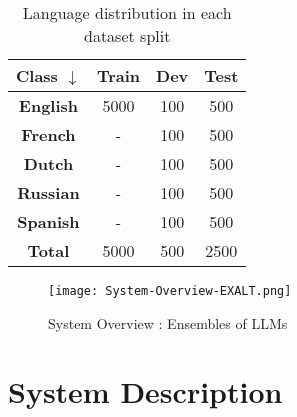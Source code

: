 \documentclass[11pt]{article}
\begin{document}
\begin{table}[!ht]
    \centering
    \begin{tabular}{|c|c|c|c|}
    \hline
    \textbf{Class $\downarrow$}  & \textbf{Train}       & \textbf{Dev}         & \textbf{Test}    \\
    \hline
    \textbf{English}             & 5000                 & 100                  & 500              \\
    \textbf{French}              & -                    & 100                  & 500              \\
    \textbf{Dutch}               & -                    & 100                  & 500              \\
    \textbf{Russian}             & -                    & 100                  & 500              \\
    \textbf{Spanish}             & -                    & 100                  & 500              \\
    \hline
    \textbf{Total}               & 5000                 & 500                  & 2500             \\
    \hline
    \end{tabular}
    \caption{Language distribution in each dataset split}
    \label{table:2}
\end{table}


\begin{figure*}[!ht]
    \centering
    \texttt{[image: System-Overview-EXALT.png]}
    \caption{System Overview : Ensembles of LLMs}
    \label{figure:1}
\end{figure*}

\section{System Description}
\end{document}
